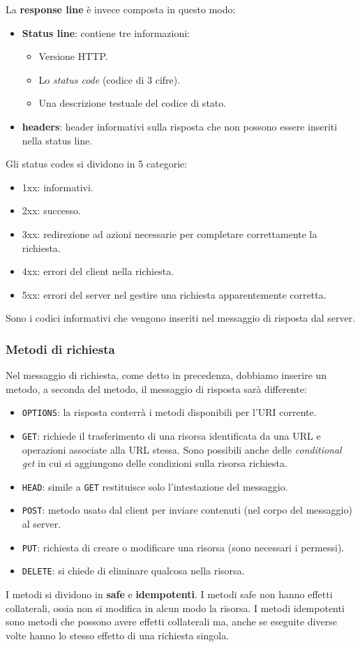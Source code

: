 La \textbf{response line} è invece composta in questo modo:
\begin{itemize}
	\item \textbf{Status line}: contiene tre informazioni:
		\begin{itemize}
			\item Versione HTTP.
			\item Lo \emph{status code} (codice di 3 cifre).
			\item Una descrizione testuale del codice di stato.
		\end{itemize}
	\item \textbf{headers}: header informativi sulla risposta che non 
		possono essere inseriti nella status line.
\end{itemize}
Gli status codes si dividono in 5 categorie:
\begin{itemize}
	\item 1xx: informativi.
	\item 2xx: successo.
	\item 3xx: redirezione ad azioni necessarie per completare 
		correttamente la richiesta.
	\item 4xx: errori del client nella richiesta.
	\item 5xx: errori del server nel gestire una richiesta 
		apparentemente corretta.
\end{itemize}
Sono i codici informativi che vengono inseriti nel messaggio di 
risposta dal server.

\subsubsection{Metodi di richiesta}
Nel messaggio di richiesta, come detto in precedenza, dobbiamo inserire
un metodo, a seconda del metodo, il messaggio di risposta sarà 
differente:
\begin{itemize}
	\item \verb|OPTIONS|: la risposta conterrà i metodi disponibili 
		per l'URI corrente.
	\item \verb|GET|: richiede il trasferimento di una risorsa 
		identificata da una URL e operazioni associate alla URL stessa.
		Sono possibili anche delle \emph{conditional get} in cui si
		aggiungono delle condizioni sulla risorsa richiesta.
	\item \verb|HEAD|: simile a \verb|GET| restituisce solo 
		l'intestazione del messaggio.
	\item \verb|POST|: metodo usato dal client per inviare contenuti 
		(nel corpo del messaggio) al server.
	\item \verb|PUT|: richiesta di creare o modificare una risorsa 
		(sono necessari i permessi).
	\item \verb|DELETE|: si chiede di eliminare qualcosa nella risorsa.
\end{itemize}
I metodi si dividono in \textbf{safe} e \textbf{idempotenti}. I metodi 
safe non hanno effetti collaterali, ossia non si modifica in alcun modo
la risorsa. I metodi idempotenti sono metodi che possono avere effetti 
collaterali ma, anche se eseguite diverse volte hanno lo stesso effetto
di una richiesta singola.

